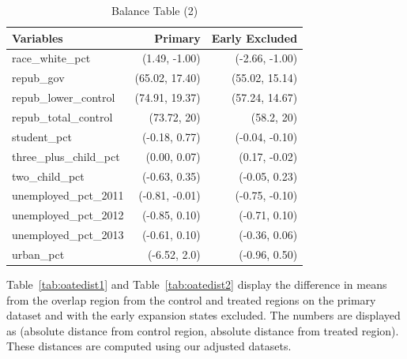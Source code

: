 \documentclass[12pt]{article}
\begin{document}
\begin{table}[ht]
\centering
\begin{tabular}{lrr}
  \toprule
Variables & Primary & Early Excluded \\ 
  \midrule
  race\_white\_pct & (1.49, -1.00) & (-2.66, -1.00) \\ 
  repub\_gov & (65.02, 17.40) & (55.02, 15.14) \\ 
  repub\_lower\_control & (74.91, 19.37) & (57.24, 14.67) \\ 
  repub\_total\_control & (73.72, 20) & (58.2, 20) \\ 
  student\_pct & (-0.18, 0.77) & (-0.04, -0.10) \\ 
  three\_plus\_child\_pct & (0.00, 0.07) & (0.17, -0.02) \\ 
  two\_child\_pct & (-0.63, 0.35) & (-0.05, 0.23) \\ 
  unemployed\_pct\_2011 & (-0.81, -0.01) & (-0.75, -0.10) \\ 
  unemployed\_pct\_2012 & (-0.85, 0.10) & (-0.71, 0.10) \\ 
  unemployed\_pct\_2013 & (-0.61, 0.10) & (-0.36, 0.06) \\ 
  urban\_pct & (-6.52, 2.0) & (-0.96, 0.50) \\ 
   \bottomrule
    \end{tabular}
    \caption{Balance Table (2)}
    \label{tab:baltab2}
\end{table}

Table~\ref{tab:oatedist1} and Table~\ref{tab:oatedist2} display the difference in means from the overlap region from the control and treated regions on the primary dataset and with the early expansion states excluded. The numbers are displayed as (absolute distance from control region, absolute distance from treated region). These distances are computed using our adjusted datasets. 
\end{document}
